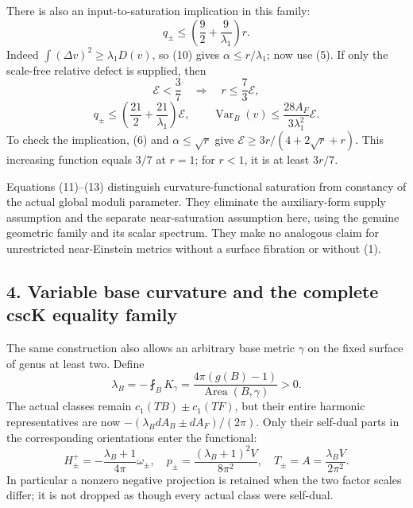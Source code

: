 \documentclass[
  11pt,
]{article}
\begin{document}
There is also an input-to-saturation implication in this family: \[
 \boxed{q_\pm\le\left(\frac92+\frac9{\lambda_1}\right)r.} 
                                                               \tag{12}
\] Indeed \(\int(\Delta v)^2\ge\lambda_1D(v)\), so (10) gives
\(\alpha\le r/\lambda_1\); now use (5). If only the scale-free relative
defect is supplied, then \[
 \mathcal E<\frac37
 \quad\Longrightarrow\quad
 r\le\frac73\mathcal E,
\] \[
 q_\pm\le\left(\frac{21}2+\frac{21}{\lambda_1}\right)\mathcal E,
 \qquad
 \operatorname{Var}_B(v)\le
          \frac{28A_F}{3\lambda_1^2}\mathcal E.         \tag{13}
\] To check the implication, (6) and \(\alpha\le\sqrt r\) give
\(\mathcal E\ge3r/(4+2\sqrt r+r)\). This increasing function equals
\(3/7\) at \(r=1\); for \(r<1\), it is at least \(3r/7\).

Equations (11)--(13) distinguish curvature-functional saturation from
constancy of the actual global moduli parameter. They eliminate the
auxiliary-form supply assumption and the separate near-saturation
assumption here, using the genuine geometric family and its scalar
spectrum. They make no analogous claim for unrestricted near-Einstein
metrics without a surface fibration or without (1).

\hypertarget{variable-base-curvature-and-the-complete-csck-equality-family}{%
\subsection{4. Variable base curvature and the complete cscK equality
family}\label{variable-base-curvature-and-the-complete-csck-equality-family}}

The same construction also allows an arbitrary base metric \(\gamma\) on
the fixed surface of genus at least two. Define \[
 \lambda_B=-\fint_B K_\gamma
      =\frac{4\pi(g(B)-1)}{\operatorname{Area}(B,\gamma)}>0.
\] The actual classes remain \(c_1(TB)\pm c_1(TF)\), but their entire
harmonic representatives are now \(- (\lambda_BdA_B\pm dA_F)/(2\pi)\).
Only their self-dual parts in the corresponding orientations enter the
functional: \[
 H_\pm^+=-\frac{\lambda_B+1}{4\pi}\omega_\pm,\quad
 p_\pm=\frac{(\lambda_B+1)^2V}{8\pi^2},\quad
 T_\pm=A=\frac{\lambda_B V}{2\pi^2}.
                                                               \tag{17}
\] In particular a nonzero negative projection is retained when the two
factor scales differ; it is not dropped as though every actual class
were self-dual.
\end{document}
